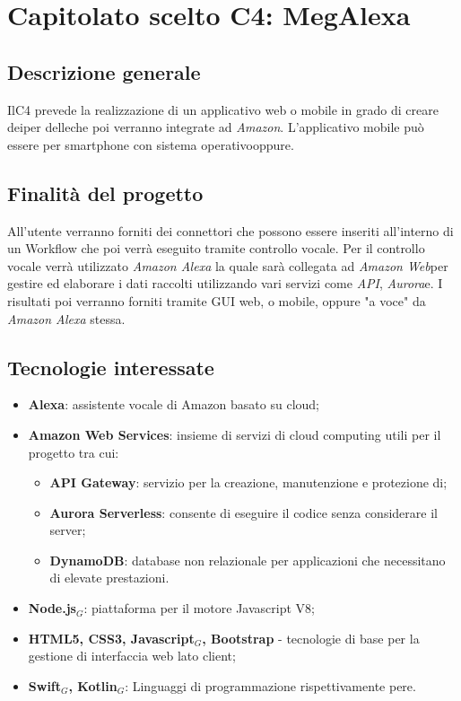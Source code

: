 \chapter{Capitolato scelto C4: MegAlexa}
\section{Descrizione generale}
IlC4 prevede la realizzazione di un applicativo web o mobile in grado di creare deiper delleche poi verranno integrate ad \textit{Amazon}.
L'applicativo mobile può essere per smartphone con sistema operativooppure.
\section{Finalit\`a del progetto}
All'utente verranno forniti dei connettori che possono essere inseriti all'interno di un Workflow che poi verrà eseguito tramite controllo vocale.  
Per il controllo vocale verrà utilizzato \emph{Amazon Alexa} la quale sarà collegata ad \textit{Amazon Web}per gestire ed elaborare i dati raccolti utilizzando vari servizi come \textit{API}, \textit{Aurora}e.
I risultati poi verranno forniti tramite GUI web, o mobile, oppure "a voce" da \emph{Amazon Alexa} stessa.
\section{Tecnologie interessate}
\begin{itemize}
	\item \textbf{Alexa}: assistente vocale di Amazon basato su cloud;
	\item \textbf{Amazon Web Services}: insieme di servizi di cloud computing utili per il progetto tra cui:
	\begin{itemize}
	\item \textbf{API Gateway}: servizio per la creazione, manutenzione e protezione di;
	\item \textbf{Aurora Serverless}: consente di eseguire il codice senza considerare il server;
	\item \textbf{DynamoDB}: database non relazionale per applicazioni che necessitano di elevate prestazioni.
	\end{itemize}
	\item \textbf{Node.js$_{G}$}: piattaforma per il motore Javascript V8;
	\item \textbf{HTML5, CSS3, Javascript$_{G}$, Bootstrap} - tecnologie di base per la gestione di interfaccia web lato client;
	\item \textbf{Swift$_{G}$, Kotlin$_{G}$}: Linguaggi di programmazione rispettivamente pere.
\end{itemize}
